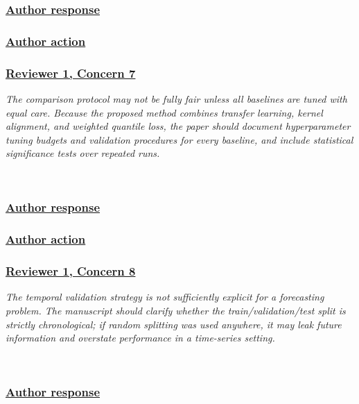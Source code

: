 \documentclass[journal,12pn, onecolumn]{IEEEtran}
\begin{document}
{{{{{{{{{{{{{\color{black}
\subsubsection*{\textbf{\underline{Author response}}}

{\color{black}
\subsubsection*{\textbf{\underline{Author action}}}

\textcolor{customgreen}{
\subsubsection*{\underline{\textbf{Reviewer 1, Concern 7}}}
\emph{The comparison protocol may not be fully fair unless all baselines are tuned with equal care. Because the proposed method combines transfer learning, kernel alignment, and weighted quantile loss, the paper should document hyperparameter tuning budgets and validation procedures for every baseline, and include statistical significance tests over repeated runs.}
}\\

{\color{black}
\subsubsection*{\textbf{\underline{Author response}}}

{\color{black}
\subsubsection*{\textbf{\underline{Author action}}}

\textcolor{customgreen}{
\subsubsection*{\underline{\textbf{Reviewer 1, Concern 8}}}
\emph{The temporal validation strategy is not sufficiently explicit for a forecasting problem. The manuscript should clarify whether the train/validation/test split is strictly chronological; if random splitting was used anywhere, it may leak future information and overstate performance in a time-series setting.}
}\\

{\color{black}
\subsubsection*{\textbf{\underline{Author response}}}

}}}}}}}}}}}}}}}}}
\end{document}
